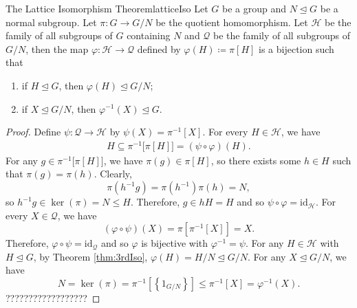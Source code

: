 \documentclass[math]{amznotes}
\theoremstyle{remark}
\newcommand{\kernel}[1]{\ker\left(#1\right)}
\newcommand{\0}{\mathbf{0}}
\newcommand{\1}{\mathbf{1}}
\begin{document}
\begin{thmbox}{The Lattice Isomorphism Theorem}{latticeIso}
    Let $G$ be a group and $N \trianglelefteq G$ be a normal subgroup. Let $\pi \colon G \to G \slash N$ be the quotient homomorphism. Let $\mathcal{H}$ be the family of all subgroups of $G$ containing $N$ and $\mathcal{Q}$ be the family of all subgroups of $G \slash N$, then the map $\varphi \colon \mathcal{H} \to \mathcal{Q}$ defined by $\varphi\left(H\right) \coloneqq \pi\left[H\right]$ is a bijection such that 
    \begin{enumerate}
        \item if $H \trianglelefteq G$, then $\varphi\left(H\right) \trianglelefteq G \slash N$;
        \item if $X \trianglelefteq G \slash N$, then $\varphi^{-1}\left(X\right) \trianglelefteq G$.
    \end{enumerate}
    \tcblower
    \begin{proof}
        Define $\psi \colon \mathcal{Q} \to \mathcal{H}$ by $\psi\left(X\right) = \pi^{-1}\left[X\right]$. For every $H \in \mathcal{H}$, we have 
        \begin{align*}
            H \subseteq \pi^{-1}\bigl[\pi\left[H\right]\bigr] = \left(\psi \circ \varphi\right)\left(H\right).
        \end{align*}
        For any $g \in \pi^{-1}\bigl[\pi\left[H\right]\bigr]$, we have $\pi\left(g\right) \in \pi\left[H\right]$, so there exists some $h \in H$ such that $\pi\left(g\right) = \pi\left(h\right)$. Clearly,
        \begin{equation*}
            \pi\left(h^{-1}g\right) = \pi\left(h^{-1}\right)\pi\left(h\right) = N,
        \end{equation*}
        so $h^{-1}g \in \kernel{\pi} = N \leq H$. Therefore, $g \in hH = H$ and so $\psi \circ \varphi = \mathrm{id}_{\mathcal{H}}$. For every $X \in \mathcal{Q}$, we have 
        \begin{equation*}
            \left(\varphi \circ \psi\right)\left(X\right) = \pi\left[\pi^{-1}\left[X\right]\right] = X.
        \end{equation*}
        Therefore, $\varphi \circ \psi = \mathrm{id}_{\mathcal{Q}}$ and so $\varphi$ is bijective with $\varphi^{-1} = \psi$. For any $H \in \mathcal{H}$ with $H \trianglelefteq G$, by Theorem \ref{thm:3rdIso}, $\varphi\left(H\right) = H \slash N \trianglelefteq G \slash N$. For any $X \trianglelefteq G \slash N$, we have
        \begin{equation*}
            N = \kernel{\pi} = \pi^{-1}\left[\left\{1_{G \slash N}\right\}\right] \leq \pi^{-1}\left[X\right] = \varphi^{-1}\left(X\right).
        \end{equation*} 
        ??????????????????
    \end{proof}
\end{thmbox}
\end{document}
